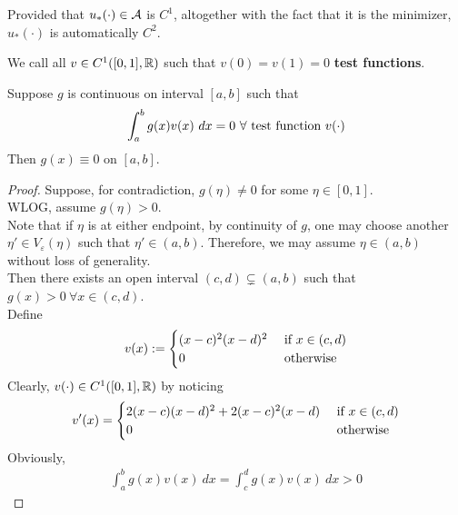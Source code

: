 \documentclass{article}
\begin{document}
	\begin{lemma}
		Provided that $u_*(\cdot) \in \mathcal{{A}}$ is $C^1$, altogether with the fact that it is the minimizer, $u_*(\cdot)$ is automatically $C^2$.
	\end{lemma}
	
	\begin{notation}
		We call all $v \in C^1([0, 1], \mathbb{R})$ such that $v(0) = v(1) = 0$ \textbf{test functions}.
	\end{notation}
	
	\begin{lemma}
		Suppose $g$ is continuous on interval $[a, b]$ such that
		\begin{align}
			\int_a^b g(x) v(x)\ dx = 0\ \forall \text{{ test function }} v(\cdot)
		\end{align}
		Then $g(x) \equiv 0$ on $[a, b]$.
	\end{lemma}
	
	\begin{proof}\renewcommand{\qedsymbol}{$\contradiction$}
		Suppose, for contradiction, $g(\eta) \neq 0$ for some $\eta \in [0, 1]$. \\
		WLOG, assume $g(\eta) > 0$. \\
		Note that if $\eta$ is at either endpoint, by continuity of $g$, one may choose another $\eta' \in V_\varepsilon(\eta)$ such that $\eta' \in (a, b)$. Therefore, we may assume $\eta \in (a, b)$ without loss of generality. \\
		Then there exists an open interval $(c, d) \subsetneq (a, b)$ such that $g(x) > 0\ \forall x \in (c, d)$. \\
		Define
		\begin{align}
			v(x) := \begin{cases}
				(x-c)^2 (x-d)^2 &\text{{ if }} x \in (c, d) \\
				0 &\text{{ otherwise}}
			\end{cases}
		\end{align}
		Clearly, $v(\cdot) \in C^1([0, 1], \mathbb{R})$ by noticing
		\begin{align}
			v'(x) = \begin{cases}
				2(x-c)(x-d)^2 + 2 (x-c)^2(x-d) &\text{{ if }} x \in (c, d) \\
				0 &\text{{ otherwise}}
			\end{cases}
		\end{align}
		Obviously,
		\begin{align}
			\int_a^b g(x) v(x)\ dx = \int_c^d g(x) v(x)\ dx > 0
		\end{align}
	\end{proof}
	
\end{document}
